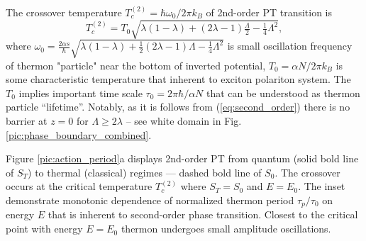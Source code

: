 \documentclass[aps, pre, preprint, groupedaddress, superscriptaddress, showkeys, showpacs] {revtex4-1}
\begin{document}
The crossover temperature $T_{c}^{(2)} = \hbar \omega_0/ 2 \pi k_B$ of 2nd-order PT transition  is 
%
\begin{equation}
T_{c}^{(2)} = T_{0} \sqrt{\lambda (1 - \lambda) + (2 \lambda - 1) \tfrac{\Lambda}{2} - \tfrac{1}{4} \Lambda^2},
\label{eq:second_order}
\end{equation}
%
where  $\omega_0 = \frac{2 \alpha s}{\hbar} \sqrt{\lambda (1 - \lambda) + \tfrac{1}{2} (2 \lambda - 1) \Lambda - \tfrac{1}{4} \Lambda^2}$ is small oscillation frequency of thermon "particle" near the bottom of inverted potential,  $T_{0}=\alpha N / 2\pi k_B$ is some characteristic temperature that inherent to exciton polariton system.  The $T_{0}$  implies important time scale $\tau_0=2\pi\hbar/ \alpha N$ that can be understood as thermon particle ``lifetime''. Notably, as it is follows from (\ref{eq:second_order}) there is no barrier at $z = 0$ for $\Lambda \ge 2\lambda$ -- see white domain in Fig. \ref{pic:phase_boundary_combined}.

Figure \ref{pic:action_period}a displays 2nd-order PT from quantum (solid bold line of $S_T$) to thermal (classical) regimes --- dashed bold line of $S_0$.
The crossover occurs at the critical temperature $T_{c}^{(2)}$ where $S_T = S_0$ and {$E = E_0$}.
The inset demonstrate monotonic dependence of normalized thermon period $\tau_p/\tau_0$ on energy $E$ that is inherent to second-order phase transition.
Closest to the critical point with energy $E=E_0$ thermon undergoes small amplitude oscillations.  
\end{document}
